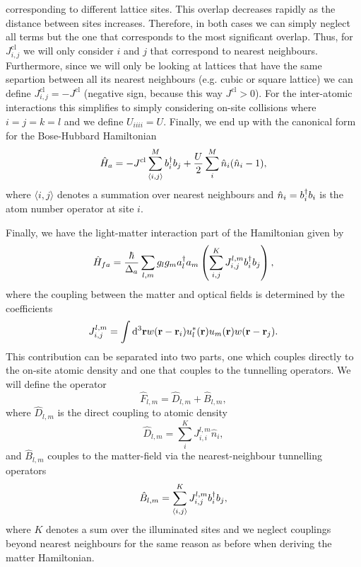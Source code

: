 corresponding to different lattice sites. This overlap decreases
rapidly as the distance between sites increases. Therefore, in both
cases we can simply neglect all terms but the one that corresponds to
the most significant overlap. Thus, for $J_{i,j}^\mathrm{cl}$ we will
only consider $i$ and $j$ that correspond to nearest neighbours.
Furthermore, since we will only be looking at lattices that have the
same separtion between all its nearest neighbours (e.g. cubic or
square lattice) we can define $J_{i,j}^\mathrm{cl} = - J^\mathrm{cl}$
(negative sign, because this way $J^\mathrm{cl} > 0$). For the
inter-atomic interactions this simplifies to simply considering
on-site collisions where $i=j=k=l$ and we define $U_{iiii} =
U$. Finally, we end up with the canonical form for the Bose-Hubbard
Hamiltonian
\begin{equation}
  \hat{H}_a = -J^\mathrm{cl} \sum_{\langle i,j \rangle}^M b^\dagger_i b_j + 
  \frac{U}{2} \sum_{i}^M \hat{n}_i (\hat{n}_i - 1),
\end{equation}
where $\langle i,j \rangle$ denotes a summation over nearest
neighbours and $\hat{n}_i = b^\dagger_i b_i$ is the atom number operator at
site $i$.

Finally, we have the light-matter interaction part of the Hamiltonian
given by
\begin{equation}
  \hat{H}_{fa} = \frac{\hbar}{\Delta_a} \sum_{l,m} g_l g_m a^\dagger_l a_m
  \left( \sum_{i,j}^K J^{l,m}_{i,j} b^\dagger_i b_j \right),
\end{equation}
where the coupling between the matter and optical fields is determined
by the coefficients
\begin{equation}
  J^{l,m}_{i,j} = \int \mathrm{d}^3 \mathbf{r} w(\mathbf{r} - \mathbf{r}_i)
  u_l^*(\mathbf{r}) u_m(\mathbf{r}) w(\mathbf{r} - \mathbf{r}_j).
\end{equation}
This contribution can be separated into two parts, one which couples
directly to the on-site atomic density and one that couples to the
tunnelling operators. We will define the operator
\begin{equation}
  \label{eq:F}
  \hat{F}_{l,m} = \hat{D}_{l,m} + \hat{B}_{l,m},
\end{equation}
where $\hat{D}_{l,m}$ is the direct coupling to atomic density
\begin{equation}
  \label{eq:D}
  \hat{D}_{l,m} = \sum_{i}^K J^{l,m}_{i,i} \hat{n}_i,
\end{equation}
and $\hat{B}_{l,m}$ couples to the matter-field via the
nearest-neighbour tunnelling operators
\begin{equation}
  \label{eq:B}
  \hat{B}_{l,m} = \sum_{\langle i, j \rangle}^K J^{l,m}_{i,j} b^\dagger_i b_j,
\end{equation}
where $K$ denotes a sum over the illuminated sites and we neglect
couplings beyond nearest neighbours for the same reason as before when
deriving the matter Hamiltonian.


